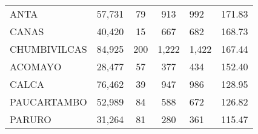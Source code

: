 \begin{tabular}{lrcclr}
	\cellcolor[HTML]{FFFF99}ANTA                                   & 57,731                                                         & 79                                                         & 913                  & 992                                                                 & 171.83                                                                       \\
	\cellcolor[HTML]{FFFF99}CANAS                                  & 40,420                                                         & 15                                                         & 667                  & 682                                                                 & 168.73                                                                       \\
	\cellcolor[HTML]{C6E0B4}CHUMBIVILCAS                           & 84,925                                                         & 200                                                        & 1,222                & 1,422                                                               & 167.44                                                                       \\
	\cellcolor[HTML]{C6E0B4}ACOMAYO                                & 28,477                                                         & 57                                                         & 377                  & 434                                                                 & 152.40                                                                       \\
	\cellcolor[HTML]{C6E0B4}CALCA                                  & 76,462                                                         & 39                                                         & 947                  & 986                                                                 & 128.95                                                                       \\
	\cellcolor[HTML]{C6E0B4}PAUCARTAMBO                            & 52,989                                                         & 84                                                         & 588                  & 672                                                                 & 126.82                                                                       \\
	\cellcolor[HTML]{C6E0B4}PARURO                                 & 31,264                                                         & 81                                                         & 280                  & 361                                                                 & 115.47                                                                       \\

\end{tabular}

